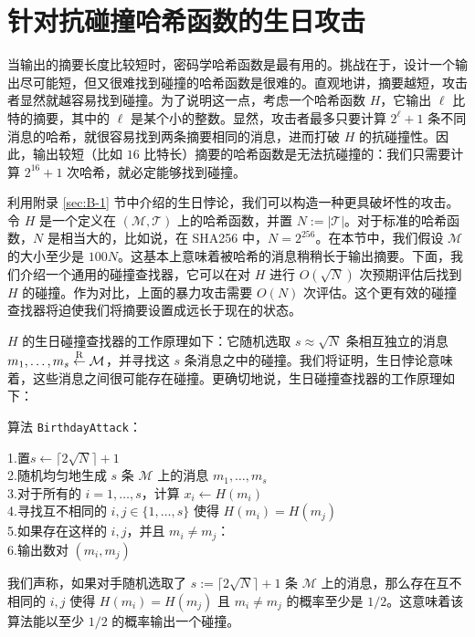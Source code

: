 \section{针对抗碰撞哈希函数的生日攻击}\label{sec:8-3}

当输出的摘要长度比较短时，密码学哈希函数是最有用的。挑战在于，设计一个输出尽可能短，但又很难找到碰撞的哈希函数是很难的。直观地讲，摘要越短，攻击者显然就越容易找到碰撞。为了说明这一点，考虑一个哈希函数 $H$，它输出 $\ell$ 比特的摘要，其中的 $\ell$ 是某个小的整数。显然，攻击者最多只要计算 $2^\ell+1$ 条不同消息的哈希，就很容易找到两条摘要相同的消息，进而打破 $H$ 的抗碰撞性。因此，输出较短（比如 $16$ 比特长）摘要的哈希函数是无法抗碰撞的：我们只需要计算 $2^{16}+1$ 次哈希，就必定能够找到碰撞。

\begin{snote}[生日攻击。]
利用附录 \ref{sec:B-1} 节中介绍的生日悖论，我们可以构造一种更具破坏性的攻击。令 $H$ 是一个定义在 $(\mathcal{M},\mathcal{T})$ 上的哈希函数，并置 $N:=|\mathcal{T}|$。对于标准的哈希函数，$N$ 是相当大的，比如说，在 SHA256 中，$N=2^{256}$。在本节中，我们假设 $\mathcal{M}$ 的大小至少是 $100N$。这基本上意味着被哈希的消息稍稍长于输出摘要。下面，我们介绍一个通用的碰撞查找器，它可以在对 $H$ 进行 $O(\sqrt{N})$ 次预期评估后找到 $H$ 的碰撞。作为对比，上面的暴力攻击需要 $O(N)$ 次评估。这个更有效的碰撞查找器将迫使我们将摘要设置成远长于现在的状态。

$H$ 的生日碰撞查找器的工作原理如下：它随机选取 $s\approx\sqrt{N}$ 条相互独立的消息 $m_1,\dots,m_s\overset{\rm R}\leftarrow\mathcal{M}$，并寻找这 $s$ 条消息之中的碰撞。我们将证明，生日悖论意味着，这些消息之间很可能存在碰撞。更确切地说，生日碰撞查找器的工作原理如下：

\vspace{5pt}

\hspace*{5pt}算法 \texttt{BirthdayAttack}：

\vspace{5pt}

\hspace*{28.5pt} 1.\quad 置$s\leftarrow\lceil 2\sqrt{N}\rceil+1$\\
\hspace*{50pt} 2.\quad 随机均匀地生成 $s$ 条 $\mathcal{M}$ 上的消息 $m_1,\dots,m_s$\\
\hspace*{50pt} 3.\quad 对于所有的 $i=1,\dots,s$，计算 $x_i\leftarrow H(m_i)$\\
\hspace*{50pt} 4.\quad 寻找互不相同的 $i,j\in\{1,\dots,s\}$ 使得 $H(m_i)=H(m_j)$\\
\hspace*{50pt} 5.\quad 如果存在这样的 $i,j$，并且 $m_i\neq m_j$：\\
\hspace*{50pt} 6.\quad\quad\quad 输出数对 $(m_i,m_j)$

\vspace{5pt}

\noindent
我们声称，如果对手随机选取了 $s:=\lceil 2\sqrt{N}\rceil+1$ 条 $\mathcal{M}$ 上的消息，那么存在互不相同的 $i,j$ 使得 $H(m_i)=H(m_j)$ 且 $m_i\neq m_j$ 的概率至少是 $1/2$。这意味着该算法能以至少 $1/2$ 的概率输出一个碰撞。
\end{snote}

